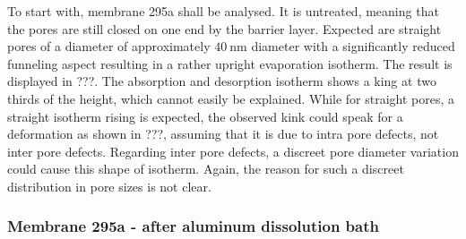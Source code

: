\documentclass[thesis.tex]{subfiles}
\begin{document}
            To start with, membrane 295a shall be analysed. It is untreated, meaning that the pores are still closed on one end by the barrier layer. Expected are straight pores of a diameter of approximately
            $\SI{40}{\nano\meter}$ diameter with a significantly reduced funneling aspect resulting in a rather upright evaporation isotherm. The result is displayed in ???. The absorption and desorption isotherm shows a king at two thirds of the height, which cannot easily be explained. While for straight pores, a straight isotherm rising is expected, the observed kink could speak for a deformation as shown in ???, assuming that it is due to intra pore defects, not inter pore defects. Regarding inter pore defects, a discreet pore diameter variation could cause this shape of isotherm. Again, the reason for such a discreet distribution in pore sizes is not clear.


            \subsubsection{Membrane 295a - after aluminum dissolution bath}
\end{document}
